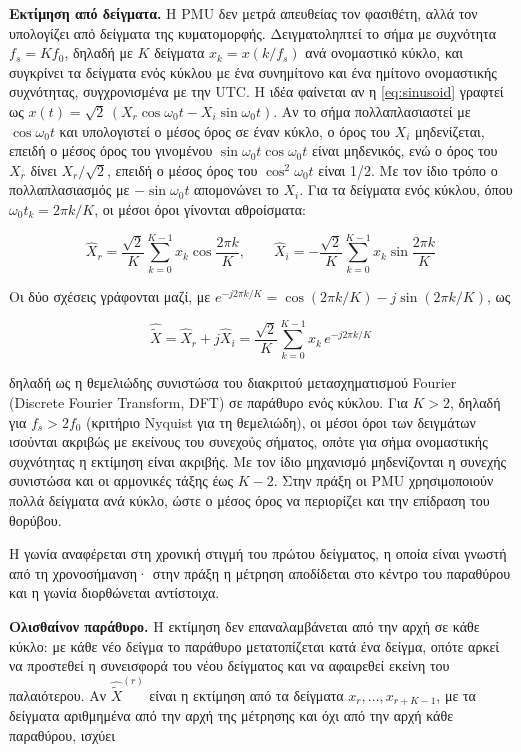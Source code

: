 \textbf{Εκτίμηση από δείγματα.} Η PMU δεν μετρά απευθείας τον φασιθέτη, αλλά τον υπολογίζει
από δείγματα της κυματομορφής. Δειγματοληπτεί το σήμα με συχνότητα $f_s = K f_0$, δηλαδή με
$K$ δείγματα $x_k = x(k/f_s)$ ανά ονομαστικό κύκλο, και συγκρίνει τα δείγματα ενός κύκλου με
ένα συνημίτονο και ένα ημίτονο ονομαστικής συχνότητας, συγχρονισμένα με την UTC. Η ιδέα
φαίνεται αν η \eqref{eq:sinusoid} γραφτεί ως
$x(t) = \sqrt{2}\,(X_r \cos\omega_0 t - X_i \sin\omega_0 t)$. Αν το σήμα πολλαπλασιαστεί με
$\cos\omega_0 t$ και υπολογιστεί ο μέσος όρος σε έναν κύκλο, ο όρος του $X_i$ μηδενίζεται,
επειδή ο μέσος όρος του γινομένου $\sin\omega_0 t \cos\omega_0 t$ είναι μηδενικός, ενώ ο όρος
του $X_r$ δίνει $X_r/\sqrt{2}$, επειδή ο μέσος όρος του $\cos^2\omega_0 t$ είναι 1/2. Με τον
ίδιο τρόπο ο πολλαπλασιασμός με $-\sin\omega_0 t$ απομονώνει το $X_i$. Για τα δείγματα ενός
κύκλου, όπου $\omega_0 t_k = 2\pi k/K$, οι μέσοι όροι γίνονται αθροίσματα:

\begin{equation}
\hat{X}_r = \frac{\sqrt{2}}{K}\sum_{k=0}^{K-1} x_k \cos\frac{2\pi k}{K}, \qquad
\hat{X}_i = -\frac{\sqrt{2}}{K}\sum_{k=0}^{K-1} x_k \sin\frac{2\pi k}{K}
\label{eq:dftparts}
\end{equation}

Οι δύο σχέσεις γράφονται μαζί, με $e^{-j2\pi k/K} = \cos(2\pi k/K) - j\sin(2\pi k/K)$, ως

\begin{equation}
\hat{\tilde{X}} = \hat{X}_r + j\hat{X}_i
= \frac{\sqrt{2}}{K} \sum_{k=0}^{K-1} x_k\, e^{-j 2\pi k / K}
\label{eq:dft}
\end{equation}

δηλαδή ως η θεμελιώδης συνιστώσα του διακριτού μετασχηματισμού Fourier (Discrete Fourier
Transform, DFT) σε παράθυρο ενός κύκλου. Για $K > 2$, δηλαδή για $f_s > 2f_0$ (κριτήριο Nyquist για τη
θεμελιώδη), οι μέσοι όροι των δειγμάτων ισούνται ακριβώς με εκείνους του συνεχούς σήματος, οπότε για σήμα ονομαστικής συχνότητας η εκτίμηση
είναι ακριβής. Με τον ίδιο μηχανισμό μηδενίζονται η συνεχής συνιστώσα και οι αρμονικές τάξης
έως $K-2$. Στην πράξη οι PMU χρησιμοποιούν πολλά δείγματα ανά κύκλο, ώστε ο μέσος όρος να
περιορίζει και την επίδραση του θορύβου.

Η γωνία αναφέρεται στη χρονική στιγμή του πρώτου δείγματος, η οποία είναι γνωστή από τη
χρονοσήμανση· στην πράξη η μέτρηση αποδίδεται στο κέντρο του παραθύρου και η γωνία
διορθώνεται αντίστοιχα.

\textbf{Ολισθαίνον παράθυρο.} Η εκτίμηση δεν επαναλαμβάνεται από την αρχή σε κάθε κύκλο: με
κάθε νέο δείγμα το παράθυρο μετατοπίζεται κατά ένα δείγμα, οπότε αρκεί να προστεθεί η
συνεισφορά του νέου δείγματος και να αφαιρεθεί εκείνη του παλαιότερου. Αν
$\hat{\tilde{X}}^{(r)}$ είναι η εκτίμηση από τα δείγματα $x_r, \ldots, x_{r+K-1}$, με τα
δείγματα αριθμημένα από την αρχή της μέτρησης και όχι από την αρχή κάθε παραθύρου, ισχύει

